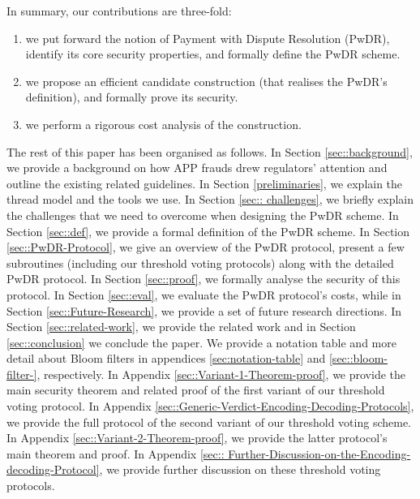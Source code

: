  


  







In summary,  our contributions are three-fold:
\begin{enumerate}
\item we put forward the notion of Payment with Dispute Resolution (PwDR), identify its core security properties, and  formally define the PwDR scheme.
\item we propose an efficient candidate construction (that realises the PwDR's definition),  and formally prove its security.
\item  we perform a rigorous cost analysis of the construction.     
\end{enumerate}





\vspace{2mm}

The rest of this paper has been organised as follows.  In Section \ref{sec::background}, we provide a background on how  APP frauds drew regulators' attention and outline the existing related guidelines. In Section \ref{preliminaries}, we explain the thread model and  the  tools we use. In Section \ref{sec:: challenges}, we briefly explain the challenges that  we need to overcome when designing  the PwDR scheme.  In Section \ref{sec::def}, we provide a formal definition of the PwDR scheme. In Section \ref{sec::PwDR-Protocol}, we give an overview of  the PwDR protocol, present a few subroutines (including our threshold voting protocols) along with the detailed PwDR protocol. In Section \ref{sec::proof}, we formally analyse the security of this protocol. In Section \ref{sec::eval}, we evaluate the PwDR protocol's costs, while in Section \ref{sec::Future-Research}, we provide a set of future research directions. In Section \ref{sec::related-work}, we provide the related work and in Section \ref{sec::conclusion} we conclude the paper. We provide a notation table and more detail about Bloom filters in appendices \ref{sec:notation-table} and \ref{sec::bloom-filter-}, respectively. In Appendix \ref{sec::Variant-1-Theorem-proof}, we provide the main security theorem and related  proof of the first variant of   our threshold voting protocol.  In Appendix \ref{sec::Generic-Verdict-Encoding-Decoding-Protocols}, we provide the full protocol of the second variant of our  threshold voting scheme. In Appendix \ref{sec::Variant-2-Theorem-proof}, we provide the latter protocol's main theorem and proof. In Appendix \ref{sec:: Further-Discussion-on-the-Encoding-decoding-Protocol}, we provide further discussion on these threshold voting protocols. 
